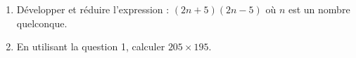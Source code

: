 
\medskip
 
\begin{enumerate}
\item Développer et réduire l'expression : $(2n + 5)(2n - 5)$ où $n$ est un nombre quelconque. 
\item En utilisant la question 1, calculer $205 \times 195$. 
\end{enumerate}

\vspace{0,5cm}

